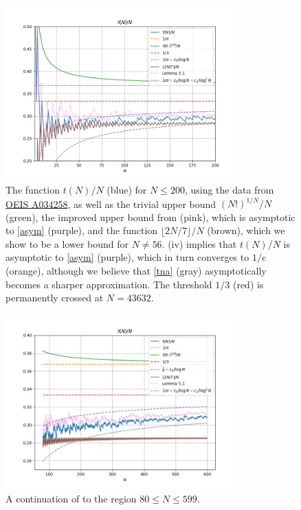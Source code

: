 \documentclass[12pt,a4paper,reqno]{amsart}
\numberwithin{equation}{section}
\theoremstyle{plain}
\theoremstyle{definition}
\begin{document}
\begin{figure}
  \centering
  \includegraphics[width=0.8\textwidth]{newplot_200.png}
  \caption{The function $t(N)/N$ (blue) for $N \leq 200$, using the data from \href{https://oeis.org/A034258}{OEIS A034258}, as well as the trivial upper bound $(N!)^{1/N}/N$ (green), the improved upper bound from  (pink), which is asymptotic to \eqref{asym} (purple), and the function $\lfloor 2N/7 \rfloor/N$ (brown), which we show to be a lower bound for $N \neq 56$.  (iv) implies that $t(N)/N$ is asymptotic to \eqref{asym} (purple), which in turn converges to $1/e$ (orange), although we believe that \eqref{tna} (gray) asymptotically becomes a sharper approximation.  The threshold $1/3$ (red) is permanently crossed at $N=43632$. 
  }\label{fig1}
  \end{figure}
  
  \begin{figure}
    \centering
    \includegraphics[width=0.8\textwidth]{newplot_600_all.png}
    \caption{A continuation of  to the region $80 \leq N \leq 599$. }\label{fig1-alt}
  \end{figure}
  
\end{document}
